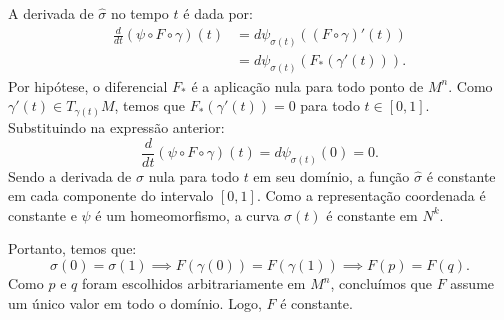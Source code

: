 {	A derivada de $\hat{\sigma}$ no tempo $t$ é dada por:
	\begin{align*}
		\frac{d}{dt} (\psi \circ F \circ \gamma)(t) &= d\psi_{\sigma(t)} \left( (F \circ \gamma)'(t) \right) \\
		&= d\psi_{\sigma(t)} \left( F_*(\gamma'(t)) \right).
	\end{align*}
	Por hipótese, o diferencial $F_*$ é a aplicação nula para todo ponto de $M^n$. Como $\gamma'(t) \in T_{\gamma(t)} M$, temos que $F_*(\gamma'(t)) = 0$ para todo $t \in [0, 1]$. Substituindo na expressão anterior:
	\begin{equation*}
		\frac{d}{dt} (\psi \circ F \circ \gamma)(t) = d\psi_{\sigma(t)}(0) = 0.
	\end{equation*}
	Sendo a derivada de $\hat{\sigma}$ nula para todo $t$ em seu domínio, a função $\hat{\sigma}$ é constante em cada componente do intervalo $[0,1]$. Como a representação coordenada é constante e $\psi$ é um homeomorfismo, a curva $\sigma(t)$ é constante em $N^k$.
	
	Portanto, temos que:
	\begin{equation*}
		\sigma(0) = \sigma(1) \implies F(\gamma(0)) = F(\gamma(1)) \implies F(p) = F(q).
	\end{equation*}
	Como $p$ e $q$ foram escolhidos arbitrariamente em $M^n$, concluímos que $F$ assume um único valor em todo o domínio. Logo, $F$ é constante.
}
